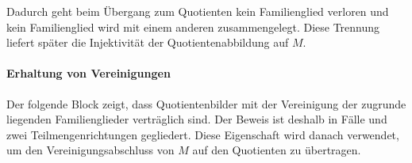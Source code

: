 \documentclass[main.tex]{subfiles}
\begin{document}
Dadurch geht beim Übergang zum Quotienten kein Familienglied verloren und kein
Familienglied wird mit einem anderen zusammengelegt. Diese Trennung liefert
später die Injektivität der Quotientenabbildung auf \(M\).

\paragraph{Erhaltung von Vereinigungen}

Der folgende Block zeigt, dass Quotientenbilder mit der Vereinigung der
zugrunde liegenden Familienglieder verträglich sind. Der Beweis ist deshalb in
Fälle und zwei Teilmengenrichtungen gegliedert. Diese Eigenschaft wird danach
verwendet, um den Vereinigungsabschluss von \(M\) auf den Quotienten zu
übertragen.

\end{document}
